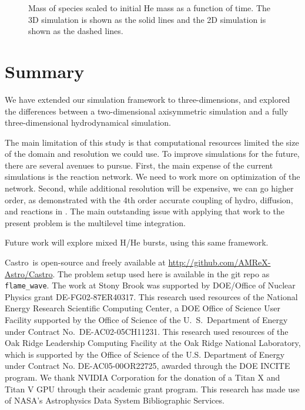 \documentclass[twocolumn,times,tighten]{aastex631}
\newcommand{\castro}{{\sf Castro}}
\begin{document}
\begin{figure}[t]
\centering
{}
\caption{\label{fig:mass_plot} Mass of species scaled to initial He mass as a function of time.  The 3D simulation is shown as the solid lines and the 2D simulation is shown as the dashed lines.}
\end{figure}

\section{Summary}

We have extended our simulation framework to three-dimensions, and
explored the differences between a two-dimensional axisymmetric
simulation and a fully three-dimensional hydrodynamical simulation.

The main limitation of this study is that computational resources
limited the size of the domain and resolution we could use.  To
improve simulations for the future, there are several avenues to
pursue.  First, the main expense of the current simulations is the
reaction network.  We need to work more on optimization of the
network.  Second, while additional resolution will be expensive, we
can go higher order, as demonstrated with the 4th order accurate
coupling of hydro, diffusion, and reactions in \cite{castro-sdc}.  The
main outstanding issue with applying that work to the present problem
is the multilevel time integration.

Future work will explore mixed H/He bursts, using this same framework.

\begin{acknowledgements}
\castro\ is open-source and freely available at
\url{http://github.com/AMReX-Astro/Castro}.  The problem setup used
here is available in the git repo as {\tt flame\_wave}.  The work at
Stony Brook was supported by DOE/Office of Nuclear Physics grant
DE-FG02-87ER40317.  This research used resources of the National
Energy Research Scientific Computing Center, a DOE Office of Science
User Facility supported by the Office of Science of the
U.~S.\ Department of Energy under Contract No.\ DE-AC02-05CH11231.
This research used resources of the Oak Ridge Leadership Computing
Facility at the Oak Ridge National Laboratory, which is supported by
the Office of Science of the U.S. Department of Energy under Contract
No. DE-AC05-00OR22725, awarded through the DOE INCITE program.  We
thank NVIDIA Corporation for the donation of a Titan X and Titan V GPU
through their academic grant program.  This research has made use of
NASA's Astrophysics Data System Bibliographic Services.
\end{acknowledgements}
\end{document}
